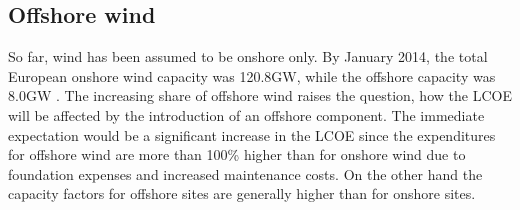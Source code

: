 \documentclass[a4paper, 5p, sort&compress]{elsarticle}%
\begin{document}



\subsection{Offshore wind}
\label{sec:offshore-wind}

So far, wind has been assumed to be onshore only. By January 2014, the
total European onshore wind capacity was 120.8GW, while the offshore
capacity was 8.0GW \cite{EWEA}. %
The increasing share of offshore wind raises the question, how the
LCOE will be affected by the introduction of an offshore
component. The immediate expectation would be a significant increase
in the LCOE since the expenditures for offshore wind are more than
100\% higher than for onshore wind due to foundation expenses and
increased maintenance costs. On the other hand the capacity factors
for offshore sites are generally higher than for onshore sites.
\end{document}
